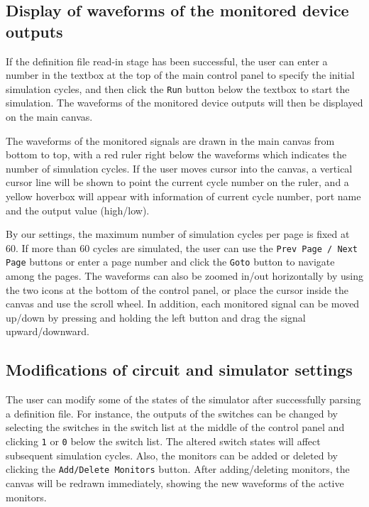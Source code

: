 \documentclass[10pt,a4paper]{article}
\begin{document}
\subsection{Display of waveforms of the monitored device outputs}
\label{sec:orgfc06881}

If the definition file read-in stage has been successful, the user can
enter a number in the textbox at the top of the main control panel to
specify the initial simulation cycles, and then click the \texttt{Run} button
below the textbox to start the simulation. The waveforms of the
monitored device outputs will then be displayed on the main canvas.

The waveforms of the monitored signals are drawn in the main canvas
from bottom to top, with a red ruler right below the waveforms which
indicates the number of simulation cycles. If the user moves cursor
into the canvas, a vertical cursor line will be shown to point the
current cycle number on the ruler, and a yellow hoverbox will appear
with information of current cycle number, port name and the output
value (high/low).

By our settings, the maximum number of simulation cycles per page is
fixed at 60. If more than 60 cycles are simulated, the user can use
the \texttt{Prev Page / Next Page} buttons or enter a page number and click
the \texttt{Goto} button to navigate among the pages. The waveforms can also
be zoomed in/out horizontally by using the two icons at the bottom of
the control panel, or place the cursor inside the canvas and use the
scroll wheel. In addition, each monitored signal can be moved up/down
by pressing and holding the left button and drag the signal
upward/downward.


\subsection{Modifications of circuit and simulator settings}
\label{sec:orgbf5cd6a}

The user can modify some of the states of the simulator after
successfully parsing a definition file. For instance, the outputs of
the switches can be changed by selecting the switches in the switch
list at the middle of the control panel and clicking \texttt{1} or \texttt{0} below
the switch list. The altered switch states will affect subsequent
simulation cycles. Also, the monitors can be added or deleted by
clicking the \texttt{Add/Delete Monitors} button. After adding/deleting
monitors, the canvas will be redrawn immediately, showing the new
waveforms of the active monitors.
\end{document}
